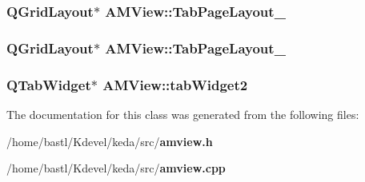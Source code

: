 \subsubsection{\setlength{\rightskip}{0pt plus 5cm}QGrid\-Layout$\ast$ {\bf AMView::Tab\-Page\-Layout\_}\hspace{0.3cm}{\tt  [protected]}}\label{classAMView_e5a89160c3de487b3e28d4b8a88c3e17}


\subsubsection{\setlength{\rightskip}{0pt plus 5cm}QGrid\-Layout$\ast$ {\bf AMView::Tab\-Page\-Layout\_}\hspace{0.3cm}{\tt  [protected]}}\label{classAMView_c8277cbce4e05fc431b4b58b198b3c9c}


\subsubsection{\setlength{\rightskip}{0pt plus 5cm}QTab\-Widget$\ast$ {\bf AMView::tab\-Widget2}}\label{classAMView_7de1b935ec5fed0b8922e3137f9d1187}




The documentation for this class was generated from the following files:\begin{CompactItemize}
\item 
/home/bastl/Kdevel/keda/src/{\bf amview.h}\item 
/home/bastl/Kdevel/keda/src/{\bf amview.cpp}\end{CompactItemize}
